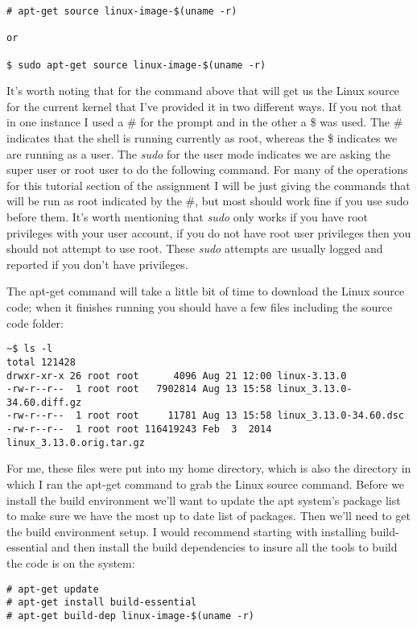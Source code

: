 \documentclass[11pt]{article}
\begin{document}
\begin{verbatim}
# apt-get source linux-image-$(uname -r)

or

$ sudo apt-get source linux-image-$(uname -r)
\end{verbatim}

It's worth noting that for the command above that will get us the Linux source for the current kernel that I've provided it in two different ways. If you not that in one instance I used a \# for the prompt and in the other a \$ was used. The \# indicates that the shell is running currently as root, whereas the \$ indicates we are running as a user. The \emph{sudo} for the user mode indicates we are asking the super user or root user to do the following command. For many of the operations for this tutorial section of the assignment I will be just giving the commands that will be run as root indicated by the \#, but most should work fine if you use sudo before them. It's worth mentioning that \emph{sudo} only works if you have root privileges with your user account, if you do not have root user privileges then you should not attempt to use root. These \emph{sudo} attempts are usually logged and reported if you don't have privileges. 

The apt-get command will take a little bit of time to download the Linux source code; when it finishes running you should have a few files including the source code folder:

\begin{verbatim}
~$ ls -l
total 121428
drwxr-xr-x 26 root root      4096 Aug 21 12:00 linux-3.13.0
-rw-r--r--  1 root root   7902814 Aug 13 15:58 linux_3.13.0-34.60.diff.gz
-rw-r--r--  1 root root     11781 Aug 13 15:58 linux_3.13.0-34.60.dsc
-rw-r--r--  1 root root 116419243 Feb  3  2014 linux_3.13.0.orig.tar.gz
\end{verbatim}

For me, these files were put into my home directory, which is also the directory in which I ran the apt-get command to grab the Linux source command. Before we install the build environment we'll want to update the apt system's package list to make sure we have the most up to date list of packages. Then we'll need to get the build environment setup. I would recommend starting with installing build-essential and then install the build dependencies to insure all the tools to build the code is on the system:

\begin{verbatim}
# apt-get update
# apt-get install build-essential
# apt-get build-dep linux-image-$(uname -r)
\end{verbatim}
\end{document}
